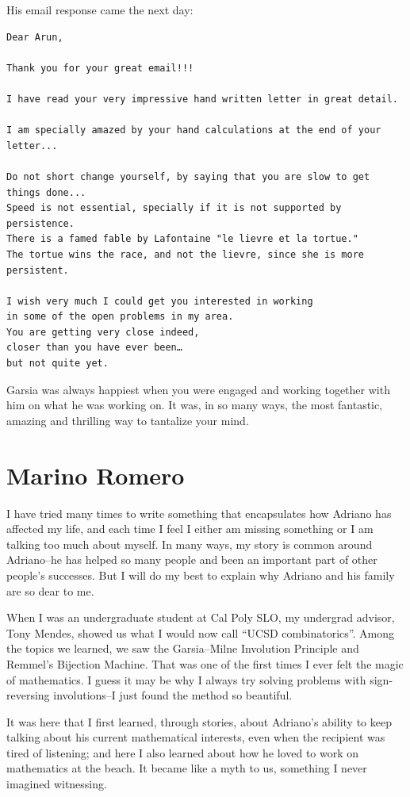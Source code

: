 \documentclass{amsart}
\begin{document}
His email response came the next day:
\begin{Verbatim}[fontsize=\small]
Dear Arun,

Thank you for your great email!!!

I have read your very impressive hand written letter in great detail.

I am specially amazed by your hand calculations at the end of your letter...

Do not short change yourself, by saying that you are slow to get things done...
Speed is not essential, specially if it is not supported by persistence.
There is a famed fable by Lafontaine "le lievre et la tortue."
The tortue wins the race, and not the lievre, since she is more persistent.

I wish very much I could get you interested in working
in some of the open problems in my area.
You are getting very close indeed,
closer than you have ever been…
but not quite yet.
\end{Verbatim}

Garsia was always happiest when you were engaged and working together with him on what he was working on.
It was, in so many ways, the most fantastic, amazing and thrilling way to tantalize your mind.

\section*{Marino Romero}

I have tried many times to write something that encapsulates how Adriano has affected my life, and each time I feel I either am missing something or I am talking too much about myself. In many ways, my story is common around Adriano--he has helped so many people and been an important part of other people's successes. But I will do my best to explain why Adriano and his family are so dear to me. 

When I was an undergraduate student at Cal Poly SLO, my undergrad advisor, Tony Mendes, showed us what I would now call ``UCSD combinatorics''. Among the topics we learned, we saw the Garsia--Milne Involution Principle and Remmel's Bijection Machine. That was one of the first times I ever felt the magic of mathematics. I guess it may be why I always try solving problems with sign-reversing involutions--I just found the method so beautiful.

It was here that I first learned, through stories, about Adriano's ability to keep talking about his current mathematical interests, even when the recipient was tired of listening; and here I also learned about how he loved to work on mathematics at the beach. It became like a myth to us, something I never imagined witnessing.
\end{document}
